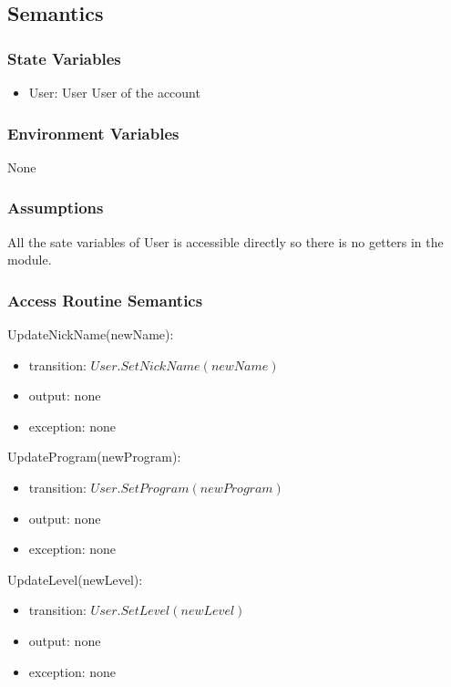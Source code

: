 \documentclass[12pt, titlepage]{article}
\begin{document}
\subsection{Semantics}

\subsubsection{State Variables}

\begin{itemize}
\item User: User
User of the account
\end{itemize}

\subsubsection{Environment Variables}

None

\subsubsection{Assumptions}

All the sate variables of User is accessible directly so there is no getters in the module.

\subsubsection{Access Routine Semantics}

\noindent UpdateNickName(newName):
\begin{itemize}
\item transition: $User.SetNickName(newName)$
\item output: none
\item exception: none
\end{itemize}

\noindent UpdateProgram(newProgram):
\begin{itemize}
\item transition: $User.SetProgram(newProgram)$
\item output: none
\item exception: none
\end{itemize}

\noindent UpdateLevel(newLevel):
\begin{itemize}
\item transition: $User.SetLevel(newLevel)$
\item output: none
\item exception: none
\end{itemize}
\end{document}
